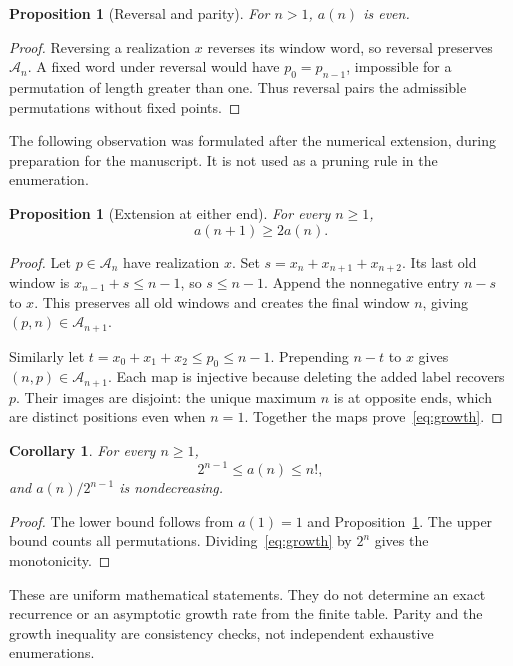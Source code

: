 \documentclass[11pt]{article}
\newtheorem{proposition}[theorem]{Proposition}
\newtheorem{corollary}[theorem]{Corollary}
\theoremstyle{definition}
\theoremstyle{remark}
\newcommand{\calA}{\mathcal A}
\begin{document}
\begin{proposition}[Reversal and parity]
\label{prop:parity}
For $n>1$, $a(n)$ is even.
\end{proposition}
\begin{proof}
Reversing a realization $x$ reverses its window word, so reversal preserves
$\calA_n$. A fixed word under reversal would have $p_0=p_{n-1}$, impossible
for a permutation of length greater than one. Thus reversal pairs the
admissible permutations without fixed points.
\end{proof}

The following observation was formulated after the numerical extension,
during preparation for the manuscript. It is not used as a pruning rule in
the enumeration.

\begin{proposition}[Extension at either end]
\label{prop:growth}
For every $n\geq1$,
\begin{equation}
 a(n+1)\geq2a(n).
 \label{eq:growth}
\end{equation}
\end{proposition}
\begin{proof}
Let $p\in\calA_n$ have realization $x$. Set
$s=x_n+x_{n+1}+x_{n+2}$. Its last old window is $x_{n-1}+s\leq n-1$,
so $s\leq n-1$. Append the nonnegative entry $n-s$ to $x$. This preserves
all old windows and creates the final window $n$, giving $(p,n)\in\calA_{n+1}$.

Similarly let $t=x_0+x_1+x_2\leq p_0\leq n-1$. Prepending $n-t$ to $x$
gives $(n,p)\in\calA_{n+1}$. Each map is injective because deleting the
added label recovers $p$. Their images are disjoint: the unique maximum $n$
is at opposite ends, which are distinct positions even when $n=1$.
Together the maps prove~\eqref{eq:growth}.
\end{proof}

\begin{corollary}
\label{cor:bounds}
For every $n\geq1$,
\[
 2^{n-1}\leq a(n)\leq n!,
\]
and $a(n)/2^{n-1}$ is nondecreasing.
\end{corollary}
\begin{proof}
The lower bound follows from $a(1)=1$ and Proposition~\ref{prop:growth}.
The upper bound counts all permutations. Dividing~\eqref{eq:growth} by
$2^n$ gives the monotonicity.
\end{proof}

These are uniform mathematical statements. They do not determine an exact
recurrence or an asymptotic growth rate from the finite table. Parity and
the growth inequality are consistency checks, not independent exhaustive
enumerations.
\end{document}
